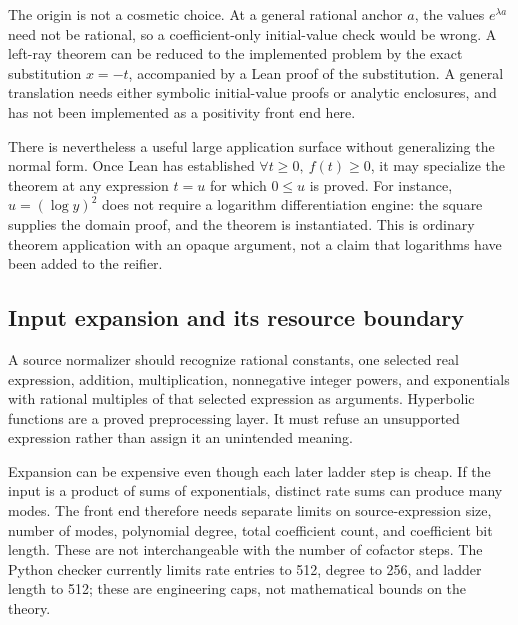 The origin is not a cosmetic choice. At a general rational anchor $a$, the values $e^{\lambda a}$ need not be rational, so a coefficient-only initial-value check would be wrong. A left-ray theorem can be reduced to the implemented problem by the exact substitution $x=-t$, accompanied by a Lean proof of the substitution. A general translation needs either symbolic initial-value proofs or analytic enclosures, and has not been implemented as a positivity front end here.

There is nevertheless a useful large application surface without generalizing the normal form. Once Lean has established $\forall t\ge0,\ f(t)\ge0$, it may specialize the theorem at any expression $t=u$ for which $0\le u$ is proved. For instance, $u=(\log y)^2$ does not require a logarithm differentiation engine: the square supplies the domain proof, and the theorem is instantiated. This is ordinary theorem application with an opaque argument, not a claim that logarithms have been added to the reifier.

\subsection{Input expansion and its resource boundary}

A source normalizer should recognize rational constants, one selected real expression, addition, multiplication, nonnegative integer powers, and exponentials with rational multiples of that selected expression as arguments. Hyperbolic functions are a proved preprocessing layer. It must refuse an unsupported expression rather than assign it an unintended meaning.

Expansion can be expensive even though each later ladder step is cheap. If the input is a product of sums of exponentials, distinct rate sums can produce many modes. The front end therefore needs separate limits on source-expression size, number of modes, polynomial degree, total coefficient count, and coefficient bit length. These are not interchangeable with the number of cofactor steps. The Python checker currently limits rate entries to 512, degree to 256, and ladder length to 512; these are engineering caps, not mathematical bounds on the theory.
